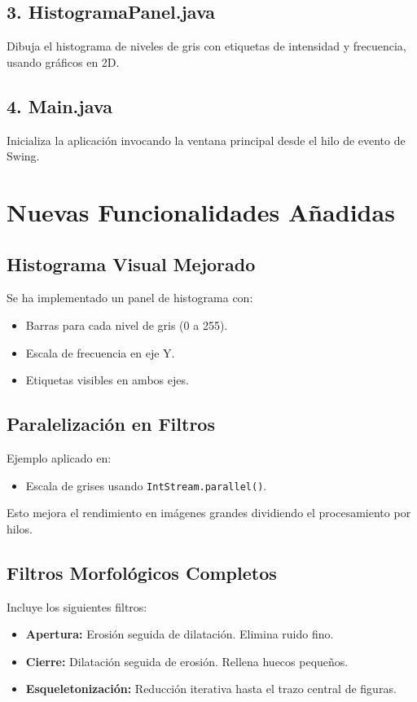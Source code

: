 \documentclass[12pt]{article}
\begin{document}
\subsection*{3. HistogramaPanel.java}
Dibuja el histograma de niveles de gris con etiquetas de intensidad y frecuencia, usando gráficos en 2D.

\subsection*{4. Main.java}
Inicializa la aplicación invocando la ventana principal desde el hilo de evento de Swing.

\section{Nuevas Funcionalidades Añadidas}

\subsection{Histograma Visual Mejorado}

Se ha implementado un panel de histograma con:
\begin{itemize}
    \item Barras para cada nivel de gris (0 a 255).
    \item Escala de frecuencia en eje Y.
    \item Etiquetas visibles en ambos ejes.
\end{itemize}

\subsection{Paralelización en Filtros}

Ejemplo aplicado en:
\begin{itemize}
    \item Escala de grises usando \texttt{IntStream.parallel()}.
\end{itemize}
Esto mejora el rendimiento en imágenes grandes dividiendo el procesamiento por hilos.

\subsection{Filtros Morfológicos Completos}

Incluye los siguientes filtros:

\begin{itemize}
    \item \textbf{Apertura:} Erosión seguida de dilatación. Elimina ruido fino.
    \item \textbf{Cierre:} Dilatación seguida de erosión. Rellena huecos pequeños.
    \item \textbf{Esqueletonización:} Reducción iterativa hasta el trazo central de figuras.
\end{itemize}
\end{document}
